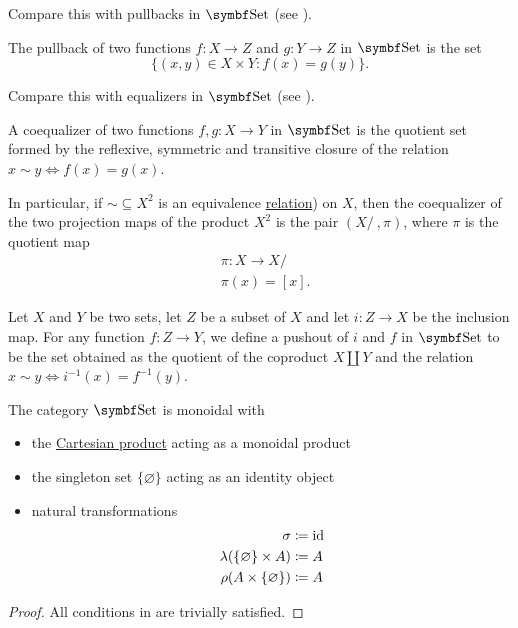 \begin{proposition}
\begin{defenum}
    Compare this with pullbacks in \( \Cat{Set} \) (see ).

     The pullback of two functions \( f: X \to Z \) and \( g: Y \to Z \) in \( \Cat{Set} \) is the set
    \begin{equation*}
      \{ (x, y) \in X \times Y \colon f(x) = g(y) \}.
    \end{equation*}

    Compare this with equalizers in \( \Cat{Set} \) (see ).

     A coequalizer of two functions \( f, g: X \to Y \) in \( \Cat{Set} \) is the quotient set formed by the reflexive, symmetric and transitive closure of the relation \( x \sim y \iff f(x) = g(x) \).

    In particular, if \( \sim \subseteq X^2 \) is an equivalence \hyperref[def:equivalence_relation]{relation}) on \( X \), then the coequalizer of the two projection maps of the product \( X^2 \) is the pair \( (X / ~, \pi) \), where \( \pi \) is the quotient map
    \begin{align*}
      &\pi: X \to X / ~ \\
      &\pi(x) = [x].
    \end{align*}

     Let \( X \) and \( Y \) be two sets, let \( Z \) be a subset of \( X \) and let \( i: Z \to X \) be the inclusion map. For any function \( f: Z \to Y \), we define a pushout of \( i \) and \( f \) in \( \Cat{Set} \) to be the set obtained as the quotient of the coproduct \( X \coprod Y \) and the relation \( x \sim y \iff i^{-1}(x) = f^{-1}(y) \).
  \end{defenum}
\end{proposition}

\begin{proposition}\label{thm:set_is_monoidal}
  The category \( \Cat{Set} \) is monoidal with
  \begin{itemize}
    \item the \hyperref[def:cartesian_product]{Cartesian product} acting as a monoidal product
    \item the singleton set \( \{ \varnothing \} \) acting as an identity object
    \item natural transformations
    \begin{align*}
      \sigma &\coloneqq \operatorname{id} \\
      \lambda(\{ \varnothing \} \times A) &\coloneqq A \\
      \rho(A \times \{ \varnothing \}) &\coloneqq A
    \end{align*}
  \end{itemize}
\end{proposition}
\begin{proof}
  All conditions in  are trivially satisfied.
\end{proof}
